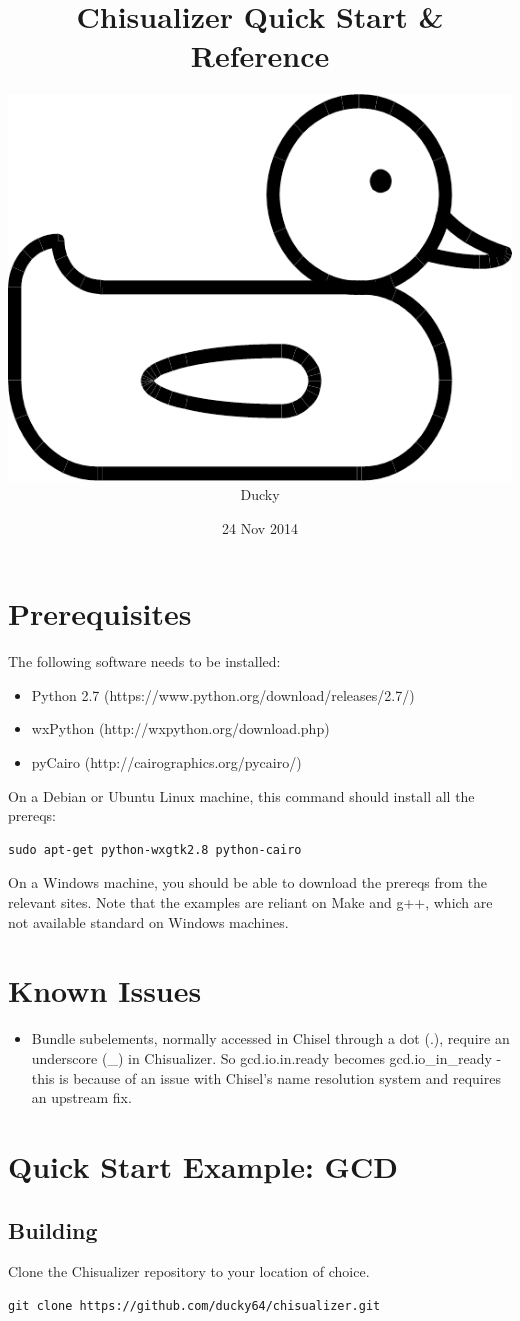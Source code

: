\documentclass[11pt]{article}
\title{\textbf{Chisualizer Quick Start \& Reference}}
\author{\includegraphics[scale=0.025]{bigduck} Ducky}
\date{24 Nov 2014}
\begin{document}
\maketitle


\section{Prerequisites}
The following software needs to be installed:
\begin{itemize}
  \item Python 2.7 (https://www.python.org/download/releases/2.7/)
  \item wxPython (http://wxpython.org/download.php)
  \item pyCairo (http://cairographics.org/pycairo/)
\end{itemize}

On a Debian or Ubuntu Linux machine, this command should install all the prereqs:
\begin{verbatim}
sudo apt-get python-wxgtk2.8 python-cairo
\end{verbatim}

On a Windows machine, you should be able to download the prereqs from the relevant sites. Note that the examples are reliant on Make and g++, which are not available standard on Windows machines.

\section{Known Issues}
\begin{itemize}
  \item Bundle subelements, normally accessed in Chisel through a dot (.), require an underscore (\_) in Chisualizer. So gcd.io.in.ready becomes gcd.io\_in\_ready - this is because of an issue with Chisel's name resolution system and requires an upstream fix.
\end{itemize}

\section{Quick Start Example: GCD}
\subsection{Building}
Clone the Chisualizer repository to your location of choice.
\begin{verbatim}
git clone https://github.com/ducky64/chisualizer.git
\end{verbatim}
\end{document}
